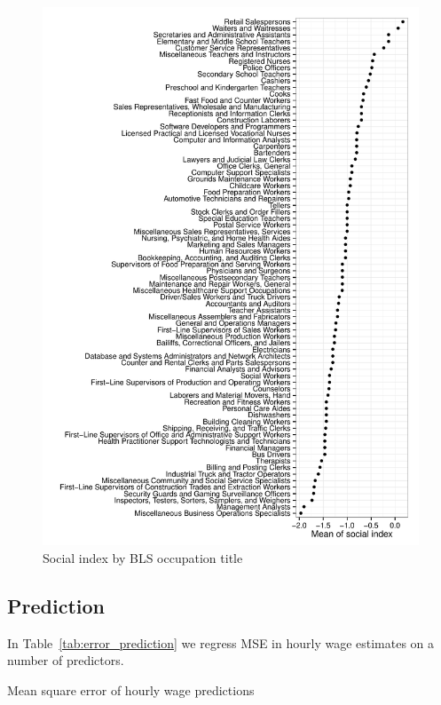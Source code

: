 \documentclass[11pt]{article}
\begin{document}
\begin{figure}
\caption{Social index by BLS occupation title} \label{fig:social_by_occupation}  
\centering
\begin{minipage}{0.95 \linewidth}
\includegraphics[width = \linewidth]{./plots/social_by_occupation.pdf}
\end{minipage}  
\end{figure} 

\subsection{Prediction} 

In Table~\ref{tab:error_prediction} we regress MSE in hourly wage estimates on a number of predictors. 

\begin{table}
\centering 
\caption{Mean square error of hourly wage predictions \label{tab:error_prediction}}
  
\end{table} 
\end{document}
